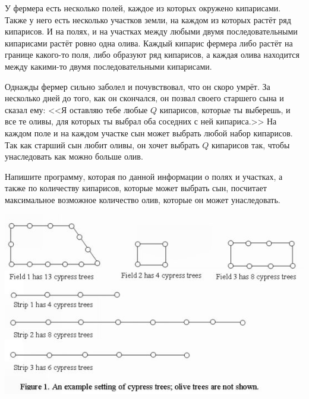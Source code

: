У фермера есть несколько полей, каждое из которых окружено кипарисами.
Также у него есть несколько участков земли, на каждом из которых
растёт ряд кипарисов.
И на полях, и на участках между любыми двумя последовательными кипарисами
растёт ровно одна олива.
Каждый кипарис фермера либо растёт на границе какого-то поля,
либо образуют ряд кипарисов,
а каждая олива находится между какими-то двумя последовательными кипарисами.

Однажды фермер сильно заболел и почувствовал, что он скоро умрёт. За несколько дней до того, 
как он скончался, он позвал своего старшего сына и сказал ему: <<Я оставляю тебе любые $Q$ кипарисов, которые ты выберешь,
и все те оливы, для которых ты выбрал оба соседних с ней кипариса.>> 
На каждом поле и на каждом участке сын может выбрать любой набор кипарисов.
Так как старший сын любит оливы, он хочет выбрать $Q$ кипарисов так,
чтобы унаследовать как можно больше олив.

Напишите программу, которая по данной информации о полях и участках, а также
по количеству кипарисов, которые может выбрать сын, посчитает максимальное
возможное количество олив, которые он может унаследовать.

\includegraphics{cypress.jpg}
